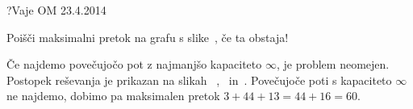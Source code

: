 \begin{naloga}{?}{Vaje OM 23.4.2014}
\begin{vprasanje}
Poišči maksimalni pretok na grafu s slike~\fig{}, če ta obstaja!

\begin{slika}
\pgfslika
{}
\end{slika}
\end{vprasanje}

\begin{odgovor}
Če najdemo povečujočo pot z najmanjšo kapaciteto $\infty$,
je problem neomejen.
Postopek reševanja je prikazan na slikah~%
,~ in~.
Povečujoče poti s kapaciteto $\infty$ ne najdemo,
dobimo pa maksimalen pretok $3+44+13 = 44+16 = 60$.

\begin{slika}
\pgfslika[pretok5a]
\end{slika}
\begin{slika}
\pgfslika[pretok5b]
\end{slika}
\begin{slika}
\pgfslika[pretok5c]
\end{slika}
\end{odgovor}
\end{naloga}
